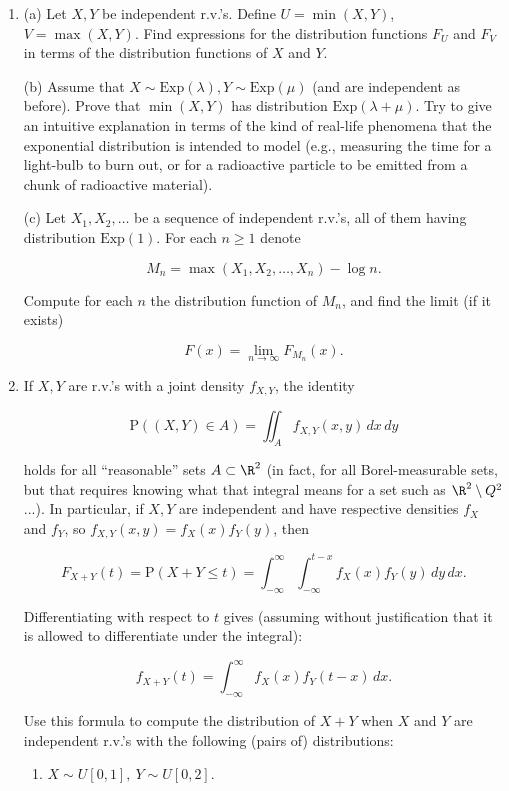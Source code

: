 \begin{enumerate}[label=\arabic*.]
\item (a) Let $X, Y$ be independent r.v.'s. Define
$U=\min(X,Y)$, $V=\max(X,Y)$. Find expressions for
the distribution functions $F_U$ and $F_V$ in terms
of the distribution functions of $X$ and $Y$.

(b) Assume that
$X \sim \textrm{Exp}(\lambda), Y \sim
\textrm{Exp}(\mu)$
(and are independent as before). Prove that
$\min(X,Y)$ has distribution
$\textrm{Exp}(\lambda+\mu)$. Try to give an intuitive
explanation in terms of the kind of real-life
phenomena that the exponential distribution is
intended to model (e.g., measuring the time for a
light-bulb to burn out, or for a radioactive particle
to be emitted from a chunk of radioactive material).

(c) Let $X_1, X_2, \ldots$ be a sequence of
independent r.v.'s, all of them having distribution
$\textrm{Exp}(1)$. For each $n\ge1$ denote

\[
M_n = \max(X_1,X_2,\ldots,X_n) - \log n.
\]

\noindent Compute for each $n$ the distribution function of
$M_n$, and find the limit (if it exists)

\[
F(x) = \lim_{n\to\infty} F_{M_n}(x).
\]

\item If $X,Y$ are r.v.'s with a joint density $f_{X,Y}$,
the identity

\[
\mathrm{P}((X,Y) \in A) = \iint_A f_{X,Y}(x,y)\,dx\,dy
\]

\noindent holds for all ``reasonable'' sets $A\subset \R^2$ (in
fact, for all Borel-measurable sets, but that requires
knowing what that integral means for a set such as
$\R^2\setminus Q^2$...). In particular, if $X,Y$ are
independent and have respective densities $f_X$ and
$f_Y$, so $f_{X,Y}(x,y)=f_X(x)f_Y(y)$, then

\[
F_{X+Y}(t) = \mathrm{P}(X+Y \le t) = \int_{-\infty}^\infty \int_{-\infty}^{t-x} f_{X}(x)f_Y(y)\,dy\,dx.
\]

\noindent Differentiating with respect to $t$ gives (assuming
without justification that it is allowed to
differentiate under the integral):

\[
f_{X+Y}(t) = \int_{-\infty}^\infty f_X(x)f_Y(t-x)\,dx.
\]

\noindent Use this formula to compute the distribution of $X+Y$
when $X$ and $Y$ are independent r.v.'s with the
following (pairs of) distributions:

\begin{enumerate}[label=\arabic*.]
\item $X \sim U[0,1],\ Y \sim U[0,2]$.


\end{enumerate}
\end{enumerate}
